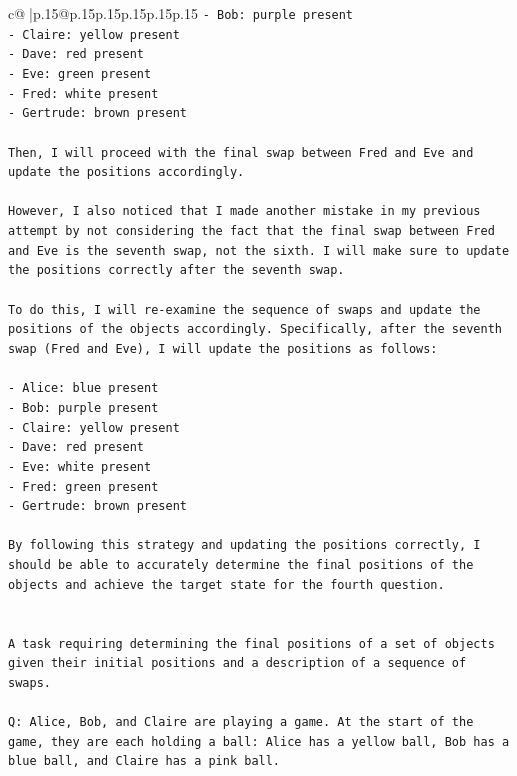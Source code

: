 \documentclass{article}
\begin{document}
{\begin{supertabular}{c@{$\;$}|p{.15\linewidth}@{}p{.15\linewidth}p{.15\linewidth}p{.15\linewidth}p{.15\linewidth}p{.15\linewidth}}
{{{\texttt{{-} Bob: purple present} \\
\texttt{{-} Claire: yellow present} \\
\texttt{{-} Dave: red present} \\
\texttt{{-} Eve: green present} \\
\texttt{{-} Fred: white present} \\
\texttt{{-} Gertrude: brown present} \\
\\ 
\texttt{Then, I will proceed with the final swap between Fred and Eve and update the positions accordingly.} \\
\\ 
\texttt{However, I also noticed that I made another mistake in my previous attempt by not considering the fact that the final swap between Fred and Eve is the seventh swap, not the sixth. I will make sure to update the positions correctly after the seventh swap.} \\
\\ 
\texttt{To do this, I will re{-}examine the sequence of swaps and update the positions of the objects accordingly. Specifically, after the seventh swap (Fred and Eve), I will update the positions as follows:} \\
\\ 
\texttt{{-} Alice: blue present} \\
\texttt{{-} Bob: purple present} \\
\texttt{{-} Claire: yellow present} \\
\texttt{{-} Dave: red present} \\
\texttt{{-} Eve: white present} \\
\texttt{{-} Fred: green present} \\
\texttt{{-} Gertrude: brown present} \\
\\ 
\texttt{By following this strategy and updating the positions correctly, I should be able to accurately determine the final positions of the objects and achieve the target state for the fourth question.} \\
\\ 
\\ 
\texttt{A task requiring determining the final positions of a set of objects given their initial positions and a description of a sequence of swaps.} \\
\\ 
\texttt{Q: Alice, Bob, and Claire are playing a game. At the start of the game, they are each holding a ball: Alice has a yellow ball, Bob has a blue ball, and Claire has a pink ball.} \\
}}}
\end{supertabular}}
\end{document}
